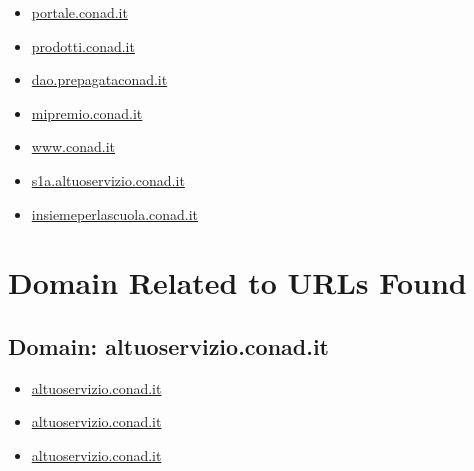 \documentclass{article}
\begin{document}
\begin{itemize}
            
            \item \href{ https://portale.conad.it/my.policy }{ portale.conad.it }
        
            
            \item \href{ http://prodotti.conad.it/ }{ prodotti.conad.it }
        
            
            \item \href{ https://dao.prepagataconad.it/ }{ dao.prepagataconad.it }
        
            
            \item \href{ https://mipremio.conad.it/ }{ mipremio.conad.it }
        
            
            \item \href{ https://www.conad.it/?utm\_source=crm\&utm\_medium=email\&utm\_content=124631197\&utm\_campaign=\_ }{ www.conad.it }
        
            
            \item \href{ https://s1a.altuoservizio.conad.it/chiusuratemporanea.html }{ s1a.altuoservizio.conad.it }
        
            
            \item \href{ https://insiemeperlascuola.conad.it/atpc/insiemeperlascuola/j/home }{ insiemeperlascuola.conad.it }
        
    
\end{itemize}

\clearpage

\section{Domain Related to URLs Found}


    
    \subsection{Domain: altuoservizio.conad.it}
    \begin{itemize}
        
            
            \item \href{ https://altuoservizio.conad.it/login.html}{ altuoservizio.conad.it }
            
            \item \href{ https://altuoservizio.conad.it/}{ altuoservizio.conad.it }
            
            \item \href{ https://s1a.altuoservizio.conad.it/chiusuratemporanea.html}{ altuoservizio.conad.it }
            
        
    \end{itemize}
\end{document}
